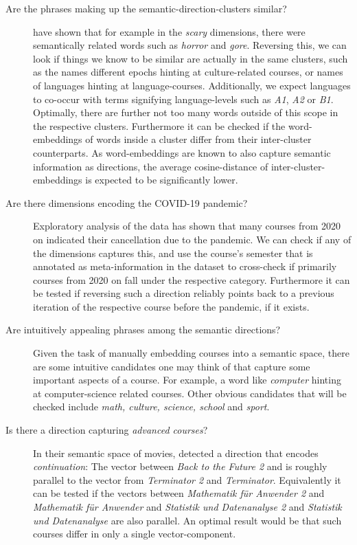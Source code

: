 \begin{description}
	\item[Are the phrases making up the semantic-direction-clusters similar?] \textcite{Derrac2015} have shown that for example in the \textit{scary} dimensions, there were semantically related words such as \textit{horror} and \textit{gore}. Reversing this, we can look if things we know to be similar are actually in the same clusters, such as the names different epochs hinting at culture-related courses, or names of languages hinting at language-courses. Additionally, we expect languages to co-occur with terms signifying language-levels such as \textit{A1}, \textit{A2} or \textit{B1}. Optimally, there are further not too many words outside of this scope in the respective clusters. Furthermore it can be checked if the word-embeddings of words inside a cluster differ from their inter-cluster counterparts. As word-embeddings are known to also capture semantic information \cite{Mikolov:Regularities} as directions, the average cosine-distance of inter-cluster-embeddings is expected to be significantly lower.
	\item[Are there dimensions encoding the COVID-19 pandemic?] Exploratory analysis of the data has shown that many courses from 2020 on indicated their cancellation due to the pandemic. We can check if any of the dimensions captures this, and use the course's semester that is annotated as meta-information in the dataset to cross-check if primarily courses from 2020 on fall under the respective category. Furthermore it can be tested if reversing such a direction reliably points back to a previous iteration of the respective course before the pandemic, if it exists.
	\item[Are intuitively appealing phrases among the semantic directions?] Given the task of manually embedding courses into a semantic space, there are some intuitive candidates one may think of that capture some important aspects of a course. For example, a word like \emph{computer} hinting at computer-science related courses. Other obvious candidates that will be checked include \emph{math, culture, science, school} and \emph{sport}.
	\item[Is there a direction capturing \textit{advanced courses}?] In their semantic space of movies, \textcite{Derrac2015} detected a direction that encodes \textit{continuation}: The vector between \textit{Back to the Future 2} and  is roughly parallel to the vector from \textit{Terminator 2} and \textit{Terminator}. Equivalently it can be tested if the vectors between \eg \textit{Mathematik für Anwender 2} and \textit{Mathematik für Anwender} and \textit{Statistik und Datenanalyse 2} and \textit{Statistik und Datenanalyse} are also parallel. An optimal result would be that such courses differ in only a single vector-component.

\end{description}
